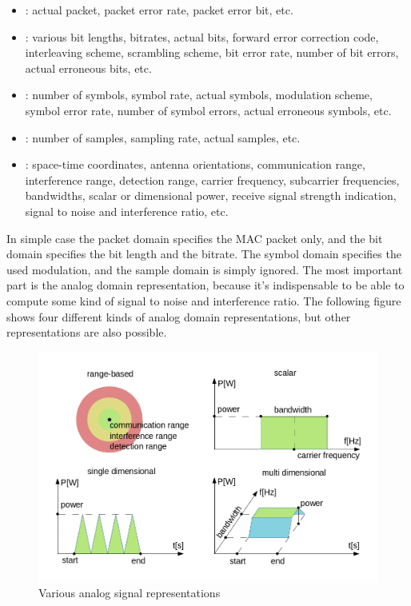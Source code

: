 \begin{itemize}
  \item {}: actual packet, packet error rate, packet error bit,
etc.
  \item {}: various bit lengths, bitrates, actual bits, forward
error correction code, interleaving scheme, scrambling scheme, bit error rate,
number of bit errors, actual erroneous bits, etc.
  \item {}: number of symbols, symbol rate, actual symbols,
modulation scheme, symbol error rate, number of symbol errors, actual erroneous
symbols, etc.
  \item {}: number of samples, sampling rate, actual samples,
etc.
  \item {}: space-time coordinates, antenna orientations,
communication range, interference range, detection range, carrier frequency,
subcarrier frequencies, bandwidths, scalar or dimensional power, receive signal
strength indication, signal to noise and interference ratio, etc.
\end{itemize}

In simple case the packet domain specifies the MAC packet only, and the bit
domain specifies the bit length and the bitrate. The symbol domain specifies the
used modulation, and the sample domain is simply ignored. The most important
part is the analog domain representation, because it's indispensable to be able
to compute some kind of signal to noise and interference ratio. The following
figure shows four different kinds of analog domain representations, but other
representations are also possible.

\begin{figure}[h!]
\centering
\includegraphics[width=\textwidth]{figures/phyanalog}
\caption{Various analog signal representations}
\end{figure}

